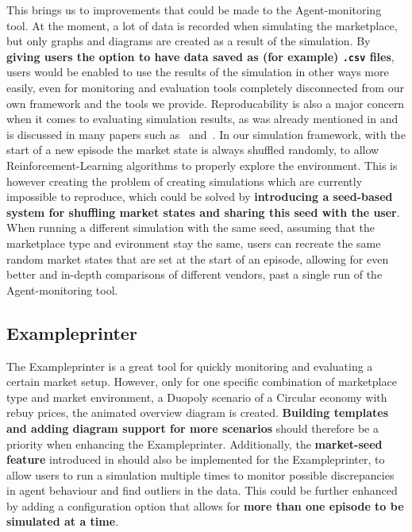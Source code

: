 This brings us to improvements that could be made to the Agent-monitoring tool. At the moment, a lot of data is recorded when simulating the marketplace, but only graphs and diagrams are created as a result of the simulation. By \textbf{giving users the option to have data saved as (for example) \texttt{.csv} files}, users would be enabled to use the results of the simulation in other ways more easily, even for monitoring and evaluation tools completely disconnected from our own framework and the tools we provide. Reproducability is also a major concern when it comes to evaluating simulation results, as was already mentioned in  and is discussed in many papers such as~\cite{DRLThatMatters} and~\cite{ReproducabilityRL}. In our simulation framework, with the start of a new episode the market state is always shuffled randomly, to allow Reinforcement-Learning algorithms to properly explore the environment. This is however creating the problem of creating simulations which are currently impossible to reproduce, which could be solved by \textbf{introducing a seed-based system for shuffling market states and sharing this seed with the user}. When running a different simulation with the same seed, assuming that the marketplace type and evironment stay the same, users can recreate the same random market states that are set at the start of an episode, allowing for even better and in-depth comparisons of different vendors, past a single run of the Agent-monitoring tool.

\subsection*{Exampleprinter}\label{subsec:FutureExampleprinter}

The Exampleprinter is a great tool for quickly monitoring and evaluating a certain market setup. However, only for one specific combination of marketplace type and market environment, a Duopoly scenario of a Circular economy with rebuy prices, the animated overview diagram is created. \textbf{Building templates and adding diagram support for more scenarios} should therefore be a priority when enhancing the Exampleprinter. Additionally, the \textbf{market-seed feature} introduced in  should also be implemented for the Exampleprinter, to allow users to run a simulation multiple times to monitor possible discrepancies in agent behaviour and find outliers in the data. This could be further enhanced by adding a configuration option that allows for \textbf{more than one episode to be simulated at a time}.

